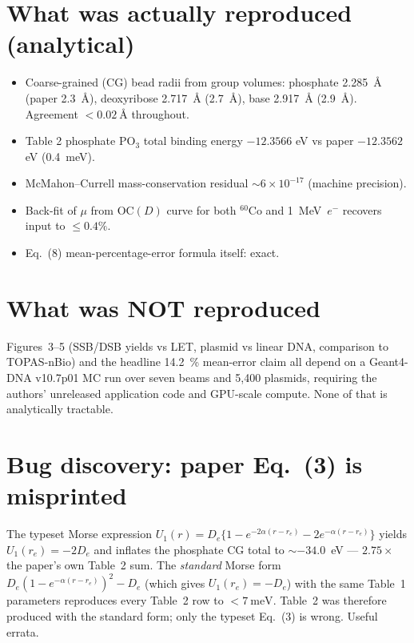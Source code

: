 \documentclass[11pt]{article}
\begin{document}
\section{What was actually reproduced (analytical)}
\begin{itemize}
  \item Coarse-grained (CG) bead radii from group volumes: phosphate
        \SI{2.285}{\angstrom} (paper \SI{2.3}{\angstrom}), deoxyribose
        \SI{2.717}{\angstrom} (\SI{2.7}{\angstrom}), base
        \SI{2.917}{\angstrom} (\SI{2.9}{\angstrom}). Agreement
        \(<\SI{0.02}{\angstrom}\) throughout.
  \item Table 2 phosphate PO$_3$ total binding energy
        \(-12.3566\) eV vs paper \(-12.3562\) eV (\SI{0.4}{\milli\electronvolt}).
  \item McMahon--Currell mass-conservation residual $\sim 6\times10^{-17}$
        (machine precision).
  \item Back-fit of $\mu$ from OC$(D)$ curve for both $^{60}$Co and
        \SI{1}{MeV}~$e^-$ recovers input to $\leq 0.4\%$.
  \item Eq.~(8) mean-percentage-error formula itself: exact.
\end{itemize}

\section{What was NOT reproduced}
Figures~3--5 (SSB/DSB yields vs LET, plasmid vs linear DNA, comparison
to TOPAS-nBio) and the headline \SI{14.2}{\percent} mean-error claim all
depend on a Geant4-DNA v10.7p01 MC run over seven beams and
5{,}400 plasmids, requiring the authors' unreleased application code and
GPU-scale compute. None of that is analytically tractable.

\section{Bug discovery: paper Eq.~(3) is misprinted}
The typeset Morse expression
\(U_1(r) = D_e\{1 - e^{-2\alpha(r-r_e)} - 2e^{-\alpha(r-r_e)}\}\)
yields $U_1(r_e) = -2 D_e$ and inflates the phosphate CG total to
$\sim -34.0$~eV --- $2.75\times$ the paper's own Table~2 sum. The
\emph{standard} Morse form $D_e(1-e^{-\alpha(r-r_e)})^2 - D_e$ (which
gives $U_1(r_e)=-D_e$) with the same Table~1 parameters reproduces
every Table~2 row to $<\SI{7}{\milli\electronvolt}$. Table~2 was
therefore produced with the standard form; only the typeset Eq.~(3) is
wrong. Useful errata.
\end{document}
